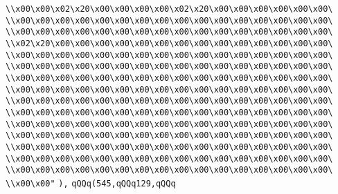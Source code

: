 \verb|\\x00\x00\x02\x20\x00\x00\x00\x00\x02\x20\x00\x00\x00\x00\x00\x00\|\newline
\verb|\\x00\x00\x00\x00\x00\x00\x00\x00\x00\x00\x00\x00\x00\x00\x00\x00\|\newline
\verb|\\x00\x00\x00\x00\x00\x00\x00\x00\x00\x00\x00\x00\x00\x00\x00\x00\|\newline
\verb|\\x02\x20\x00\x00\x00\x00\x00\x00\x00\x00\x00\x00\x00\x00\x00\x00\|\newline
\verb|\\x00\x00\x00\x00\x00\x00\x00\x00\x00\x00\x00\x00\x00\x00\x00\x00\|\newline
\verb|\\x00\x00\x00\x00\x00\x00\x00\x00\x00\x00\x00\x00\x00\x00\x00\x00\|\newline
\verb|\\x00\x00\x00\x00\x00\x00\x00\x00\x00\x00\x00\x00\x00\x00\x00\x00\|\newline
\verb|\\x00\x00\x00\x00\x00\x00\x00\x00\x00\x00\x00\x00\x00\x00\x00\x00\|\newline
\verb|\\x00\x00\x00\x00\x00\x00\x00\x00\x00\x00\x00\x00\x00\x00\x00\x00\|\newline
\verb|\\x00\x00\x00\x00\x00\x00\x00\x00\x00\x00\x00\x00\x00\x00\x00\x00\|\newline
\verb|\\x00\x00\x00\x00\x00\x00\x00\x00\x00\x00\x00\x00\x00\x00\x00\x00\|\newline
\verb|\\x00\x00\x00\x00\x00\x00\x00\x00\x00\x00\x00\x00\x00\x00\x00\x00\|\newline
\verb|\\x00\x00\x00\x00\x00\x00\x00\x00\x00\x00\x00\x00\x00\x00\x00\x00\|\newline
\verb|\\x00\x00\x00\x00\x00\x00\x00\x00\x00\x00\x00\x00\x00\x00\x00\x00\|\newline
\verb|\\x00\x00\x00\x00\x00\x00\x00\x00\x00\x00\x00\x00\x00\x00\x00\x00\|\newline
\verb|\\x00\x00"|\newline
\verb|),|\newline
\verb|qQQq(545,qQQq129,qQQq|\newline

